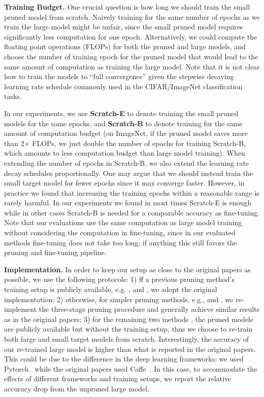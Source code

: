 \textbf{Training Budget.}
One crucial question is how long we should train the small pruned model from scratch. Naively training for the same number of epochs as we train the large model might be unfair, since the small pruned model requires significantly less computation for one epoch. Alternatively, we could compute the floating point operations (FLOPs) for both the pruned and large models, and choose the number of training epoch for the pruned model that would lead to the same amount of computation as training the large model. Note that it is not clear how to train the models to ``full convergence'' given the stepwise decaying learning rate schedule commonly used in the CIFAR/ImageNet classification tasks. 

In our experiments, we use \textbf{Scratch-E} to denote training the small pruned models for the same epochs, and \textbf{Scratch-B} to denote training for the same amount of computation budget (on ImageNet, if the pruned model saves more than 2$\times$ FLOPs, we just double the number of epochs for training Scratch-B, which amounts to less computation budget than large model training). When extending the number of epochs in Scratch-B, we also extend the learning rate decay schedules proportionally. One may argue that we should instead train the small target model for fewer epochs since it may converge faster. However, in practice we found that increasing the training epochs within a reasonable range is rarely harmful. In our experiments we found in most times Scratch-E is enough while in other cases Scratch-B is needed for a comparable accuracy as fine-tuning. Note that our evaluations use the same computation as large model training without considering the computation in fine-tuning, since in our evaluated methods fine-tuning does not take too long; if anything this still favors the pruning and fine-tuning pipeline.

\textbf{Implementation.}
In order to keep our setup as close to the original papers as possible, we use the following protocols: 1) ff a previous pruning method's training setup is publicly available, e.g. \cite{liu2017learning}, \cite{huang2018data} and \cite{he2018sfp}, we adopt the original implementation; 2) otherwise, for simpler pruning methods, e.g., \cite{li2016pruning} and  \cite{han2015learning}, we re-implement the three-stage pruning procedure and generally achieve similar results as in the original papers; 3) for the remaining two methods \citep{luo2017thinet, he2017channel}, the pruned models are publicly available but without the training setup, thus we choose to re-train both large and small target models from scratch. Interestingly, the accuracy of our re-trained large model is higher than what is reported in the original papers. This could be due to the difference in the deep learning frameworks: we used Pytorch~\citep{pytorch} while the original papers used Caffe~\citep{caffe}. In this case, to accommodate the effects of different frameworks and training setups, we report the relative accuracy drop from the unpruned large model.

